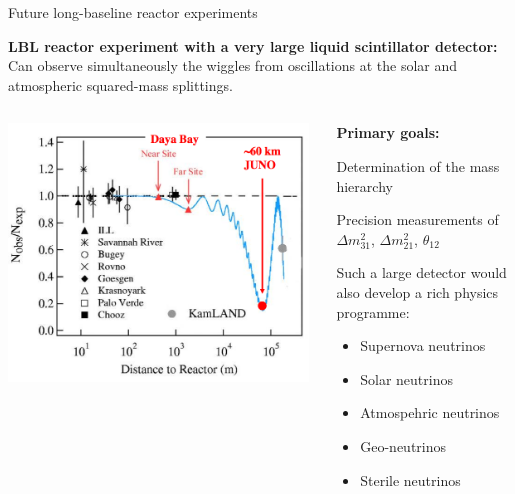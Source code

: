 \begin{frame}{Future long-baseline reactor experiments}

{\small
 {\bf LBL reactor experiment with a very large liquid scintillator detector:}\\
 Can observe simultaneously the wiggles from oscillations at the solar and atmospheric
 squared-mass splittings.\\
}
\begin{columns}[T]
  \begin{column}{0.55\textwidth}
    \centering
     \includegraphics[width=0.98\textwidth]{./images/3nu/reactor/juno_deficit_vs_distance.png}\\
  \end{column}
  \begin{column}{0.45\textwidth}
  {\scriptsize
      {\bf \color{red}Primary goals:}\\
      \begin{itemize}
       {\color{red}
        \item Determination of the mass hierarchy
        \item Precision measurements of ${\Delta}m^{2}_{31}$, ${\Delta}m^{2}_{21}$, $\theta_{12}$
       }
      \end{itemize}
      Such a large detector would also develop a rich physics programme:\\
      \begin{itemize}
        \item Supernova neutrinos
        \item Solar neutrinos
        \item Atmospehric neutrinos
        \item Geo-neutrinos
        \item Sterile neutrinos
      \end{itemize}
  }
  \end{column}
\end{columns}
\end{frame}



